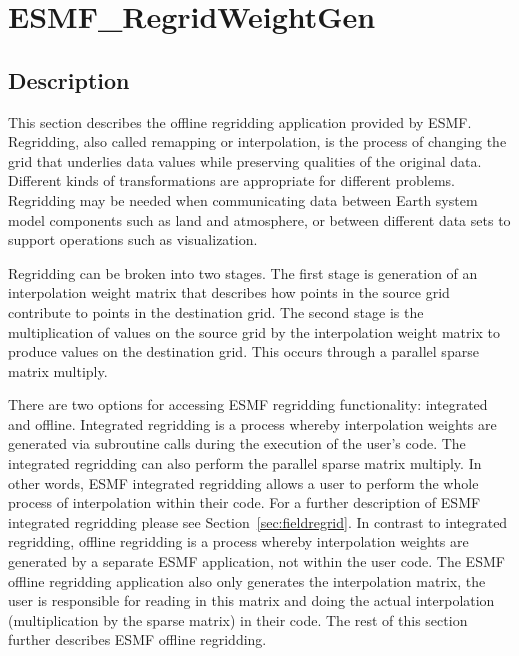 
\section{ESMF\_RegridWeightGen}
\label{sec:ESMF_RegridWeightGen}

\subsection{Description}

This section describes the offline regridding application provided by ESMF. Regridding, also called remapping or interpolation, is the process of changing the grid that underlies data values while preserving qualities of the original data. Different kinds of transformations are appropriate for different problems. Regridding may be needed when communicating data between Earth system model components such as land and atmosphere, or between different data sets to support operations such as visualization.

Regridding can be broken into two stages. The first stage is generation of an interpolation weight matrix that describes how points in 
the source grid contribute to points in the destination grid. The second stage is the multiplication of values on the source grid by the
interpolation weight matrix to produce values on the destination grid. This occurs through a parallel sparse matrix multiply.

There are two options for accessing ESMF regridding functionality: integrated and offline. Integrated regridding is a process whereby interpolation 
weights are generated via subroutine calls during the execution of the user's code. The integrated regridding can also perform the parallel sparse 
matrix multiply. In other words, ESMF integrated regridding allows a user to perform the whole process of interpolation within their code.
For a further description of ESMF integrated regridding please see Section~\ref{sec:fieldregrid}. 
In contrast to integrated regridding, 
offline regridding is a process whereby interpolation weights are generated by a separate ESMF application, not within the user code. The ESMF offline 
regridding application also only generates the interpolation matrix, the user is responsible for reading in this matrix and doing the actual interpolation
(multiplication by the sparse matrix) in their code. The rest of this section further describes ESMF offline regridding. 

